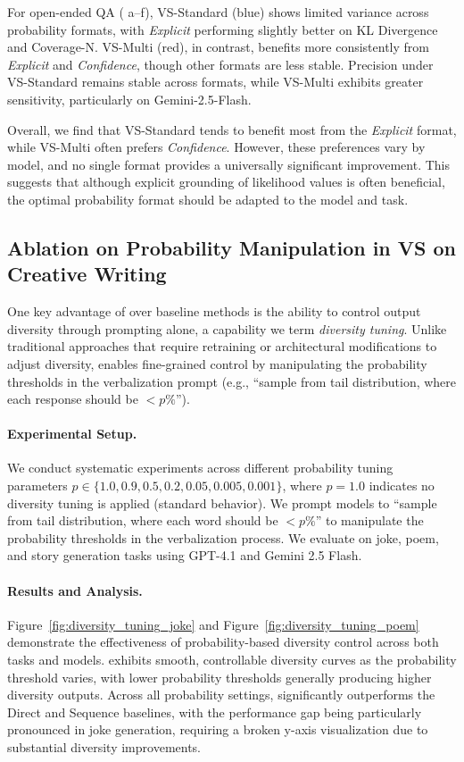 For open-ended QA ( a–f), VS-Standard (blue) shows limited variance across probability formats, with \textit{Explicit} performing slightly better on KL Divergence and Coverage-N. VS-Multi (red), in contrast, benefits more consistently from \textit{Explicit} and \textit{Confidence}, though other formats are less stable. Precision under VS-Standard remains stable across formats, while VS-Multi exhibits greater sensitivity, particularly on Gemini-2.5-Flash. 

Overall, we find that VS-Standard tends to benefit most from the \textit{Explicit} format, while VS-Multi often prefers \textit{Confidence}. However, these preferences vary by model, and no single format provides a universally significant improvement. This suggests that although explicit grounding of likelihood values is often beneficial, the optimal probability format should be adapted to the model and task.


\newpage
\subsection{Ablation on Probability Manipulation in VS on Creative Writing} \label{sec:ablation_diversity_tuning_creativity}

One key advantage of \ours over baseline methods is the ability to control output diversity through prompting alone, a capability we term \textit{diversity tuning}. Unlike traditional approaches that require retraining or architectural modifications to adjust diversity, \ours enables fine-grained control by manipulating the probability thresholds in the verbalization prompt (e.g., ``sample from tail distribution, where each response should be $< p\%$'').

\paragraph{Experimental Setup.}
We conduct systematic experiments across different probability tuning parameters $p \in \{1.0, 0.9, 0.5, 0.2, 0.05, 0.005, 0.001\}$, where $p = 1.0$ indicates no diversity tuning is applied (standard \ours behavior). We prompt models to ``sample from tail distribution, where each word should be $< p\%$'' to manipulate the probability thresholds in the verbalization process. We evaluate \ours on joke, poem, and story generation tasks using GPT-4.1 and Gemini 2.5 Flash.

\paragraph{Results and Analysis.}
Figure~\ref{fig:diversity_tuning_joke} and Figure~\ref{fig:diversity_tuning_poem} demonstrate the effectiveness of probability-based diversity control across both tasks and models. \ours exhibits smooth, controllable diversity curves as the probability threshold varies, with lower probability thresholds generally producing higher diversity outputs. Across all probability settings, \ours significantly outperforms the Direct and Sequence baselines, with the performance gap being particularly pronounced in joke generation, requiring a broken y-axis visualization due to substantial diversity improvements.

